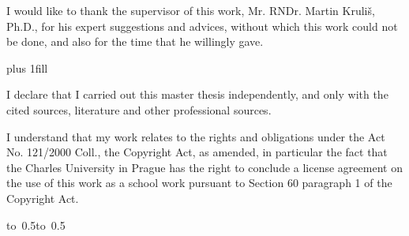 \documentclass[12pt,a4paper]{report}
\let\openright=\clearpage
\begin{document}
\newpage



\openright

\noindent
I would like to thank the supervisor of this work, Mr. RNDr. Martin Kruliš, Ph.D., for his expert suggestions and advices, without which this work could not be done, and also for the time that he willingly gave.

\newpage


\vglue 0pt plus 1fill

\noindent
I declare that I carried out this master thesis independently, and only with the cited
sources, literature and other professional sources.

\medskip\noindent
I understand that my work relates to the rights and obligations under the Act No.
121/2000 Coll., the Copyright Act, as amended, in particular the fact that the Charles
University in Prague has the right to conclude a license agreement on the use of this
work as a school work pursuant to Section 60 paragraph 1 of the Copyright Act.

\vspace{10mm}

\hbox{\hbox to 0.5\hbox to 0.5}

\vspace{20mm}
\newpage

\end{document}
